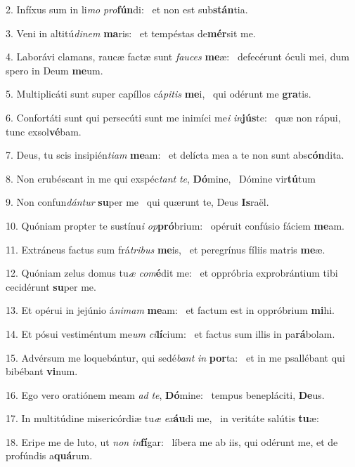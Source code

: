 2. Infíxus sum in li\textit{mo} \textit{pro}\textbf{fún}di: \ast\  et non est sub\textbf{stán}tia.\

3. Veni in altitú\textit{di}\textit{nem} \textbf{ma}ris: \ast\  et tempéstas de\textbf{mér}sit me.\

4. Laborávi clamans, raucæ factæ sunt \textit{fau}\textit{ces} \textbf{me}æ: \ast\  defecérunt óculi mei, dum spero in Deum \textbf{me}um.\

5. Multiplicáti sunt super capíllos cá\textit{pi}\textit{tis} \textbf{me}i, \ast\  qui odérunt me \textbf{gra}tis.\

6. Confortáti sunt qui persecúti sunt me inimíci me\textit{i} \textit{in}\textbf{jús}te: \ast\  quæ non rápui, tunc exsol\textbf{vé}bam.\

7. Deus, tu scis insipién\textit{ti}\textit{am} \textbf{me}am: \ast\  et delícta mea a te non sunt abs\textbf{cón}dita.\

8. Non erubéscant in me qui exspéc\textit{tant} \textit{te}, \textbf{Dó}mine, \ast\  Dómine vir\textbf{tú}tum\

9. Non confun\textit{dán}\textit{tur} \textbf{su}per me \ast\  qui quærunt te, Deus \textbf{Is}raël.\

10. Quóniam propter te sustínu\textit{i} \textit{op}\textbf{pró}brium: \ast\  opéruit confúsio fáciem \textbf{me}am.\

11. Extráneus factus sum frá\textit{tri}\textit{bus} \textbf{me}is, \ast\  et peregrínus fíliis matris \textbf{me}æ.\

12. Quóniam zelus domus tu\textit{æ} \textit{com}\textbf{é}dit me: \ast\  et oppróbria exprobrántium tibi cecidérunt \textbf{su}per me.\

13. Et opérui in jejúnio á\textit{ni}\textit{mam} \textbf{me}am: \ast\  et factum est in oppróbrium \textbf{mi}hi.\

14. Et pósui vestiméntum me\textit{um} \textit{ci}\textbf{lí}cium: \ast\  et factus sum illis in pa\textbf{rá}bolam.\

15. Advérsum me loquebántur, qui sedé\textit{bant} \textit{in} \textbf{por}ta: \ast\  et in me psallébant qui bibébant \textbf{vi}num.\

16. Ego vero oratiónem meam \textit{ad} \textit{te}, \textbf{Dó}mine: \ast\  tempus benepláciti, \textbf{De}us.\

17. In multitúdine misericórdiæ tu\textit{æ} \textit{ex}\textbf{áu}di me, \ast\  in veritáte salútis \textbf{tu}æ:\

18. Eripe me de luto, ut \textit{non} \textit{in}\textbf{fí}gar: \ast\  líbera me ab iis, qui odérunt me, et de profúndis a\textbf{quá}rum.\

